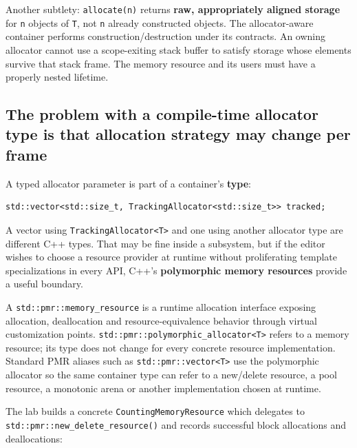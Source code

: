 Another subtlety: \texttt{allocate(n)} returns \textbf{raw, appropriately aligned storage} for \texttt{n} objects of \texttt{T}, not \texttt{n} already constructed objects. The allocator-aware container performs construction/destruction under its contracts. An owning allocator cannot use a scope-exiting stack buffer to satisfy storage whose elements survive that stack frame. The memory resource and its users must have a properly nested lifetime.

\subsection{The problem with a compile-time allocator type is that allocation strategy may change per frame}\label{01-foundations-i-ch006-the-problem-with-a-compile-time-allocator-type-is-that-allocation-strategy-may-change-per-frame}

A typed allocator parameter is part of a container's \textbf{type}:

\begin{verbatim}
std::vector<std::size_t, TrackingAllocator<std::size_t>> tracked;
\end{verbatim}

A vector using \texttt{TrackingAllocator\textless{}T\textgreater{}} and one using another allocator type are different C++ types. That may be fine inside a subsystem, but if the editor wishes to choose a resource provider at runtime without proliferating template specializations in every API, C++'s \textbf{polymorphic memory resources} provide a useful boundary.

A \texttt{std::pmr::memory\_resource} is a runtime allocation interface exposing allocation, deallocation and resource-equivalence behavior through virtual customization points. \texttt{std::pmr::polymorphic\_allocator\textless{}T\textgreater{}} refers to a memory resource; its type does not change for every concrete resource implementation. Standard PMR aliases such as \texttt{std::pmr::vector\textless{}T\textgreater{}} use the polymorphic allocator so the same container type can refer to a new/delete resource, a pool resource, a monotonic arena or another implementation chosen at runtime.

The lab builds a concrete \texttt{CountingMemoryResource} which delegates to \texttt{std::pmr::new\_delete\_resource()} and records successful block allocations and deallocations:

